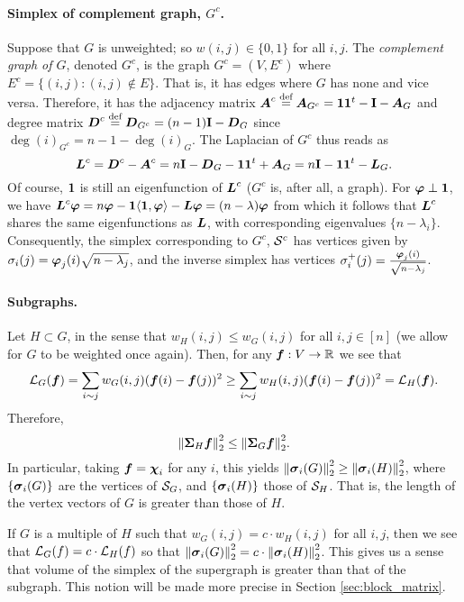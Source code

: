 \paragraph{Simplex of complement graph, $G^c$.}
Suppose that $G$ is unweighted; so $w(i,j)\in\{0,1\}$ for all $i,j$. The \emph{complement graph of $G$}, denoted $G^c$, 
is the graph $G^c=(V,E^c)$ where $E^c = \{(i,j):(i,j)\notin E\}$. That is, it has edges where $G$ has none and vice versa. Therefore, it has the adjacency matrix $\vb*{A}^c\overset{\text{def}}{=} \vb*{A}_{G^c}=\vb{1}\vb{1}^t - \vb{I}-\vb*{A}_G$ and degree matrix $\vb*{D}^c\overset{\text{def}}{=} \vb*{D}_{G^c}=(n-1)\vb{I}-\vb*{D}_G$ since $\deg(i)_{G^c}=n-1-\deg(i)_G$. The Laplacian of $G^c$ thus reads as 
\[\vb*{L}^c=\vb*{D}^c-\vb*{A}^c=n\vb{I}-\vb*{D}_G-\vb{1}\vb{1}^t+\vb*{A}_G=n\vb{I}-\vb{1}\vb{1}^t-\vb*{L}_G.\]
Of course, $\vb{1}$ is still an eigenfunction of $\vb*{L}^c$ ($G^c$ is, after all, a graph). For $\vb*{\varphi}\perp \vb{1}$, we have 
$\vb*{L}^c\vb*{\varphi} = n\vb*{\varphi} - \vb{1}\langle \vb{1},\vb*{\varphi}\rangle - \vb*{L}\vb*{\varphi} = (n-\lambda)\vb*{\varphi}$
from which it follows that $\vb*{L}^c$ shares the same eigenfunctions as $\vb*{L}$, with corresponding eigenvalues $\{n-\lambda_i\}$. Consequently, the simplex corresponding to $G^c$, $\mathcal{S}^c$ has vertices given by 
$\sigma_i(j) = \vb*{\varphi}_j(i) \sqrt{n-\lambda_j}$, 
and the inverse simplex has vertices 
$\sigma_i^+(j)=\frac{\vb*{\varphi}_j(i)}{\sqrt{n-\lambda_j}}$. 



\paragraph{Subgraphs.}
Let $H\subset G$, in the sense that $w_H(i,j)\leq w_G(i,j)$ for all $i,j\in [n]$ (we allow for $G$ to be weighted once again). Then, for any $\vb*{f}:V\to\mathbb{R}$ we see that 
\[\mathcal{L}_G(\vb*{f})=\sum_{i\sim j}w_G(i,j)(\vb*{f}(i)-\vb*{f}(j))^2 \geq \sum_{i\sim j}w_H(i,j)(\vb*{f}(i)-\vb*{f}(j))^2 =\mathcal{L}_H(\vb*{f}).\]
Therefore, 
\begin{equation*}
\norm{\boldsymbol{\Sigma}_H \vb*{f}}_2^2 \leq \norm{\boldsymbol{\Sigma}_G \vb*{f}}_2^2. 
\end{equation*}
In particular, taking $\vb*{f}=\boldsymbol{\chi}_i$ for any $i$, this yields $\norm{\vb*{\sigma}_i(G)}_2^2\geq \norm{\vb*{\sigma}_i(H)}_2^2$, where $\{\vb*{\sigma}_i(G)\}$ are the vertices of $\mathcal{S}_G$, and $\{\vb*{\sigma}_i(H)\}$ those of $\mathcal{S}_H$. That is, the length of the vertex vectors of $G$ is greater than those of $H$. 

If $G$ is a multiple of $H$ such that $w_G(i,j)=c\cdot w_H(i,j)$ for all $i,j$, then we see that $\mathcal{L}_G(f)=c\cdot \mathcal{L}_H(f)$ so that $\norm{\vb*{\sigma}_i(G)}_2^2 =c\cdot \norm{\vb*{\sigma}_i(H)}_2^2$. This gives us a sense that volume of the simplex of the supergraph is greater than that of the subgraph. This notion will be made more precise in Section \ref{sec:block_matrix}. 

